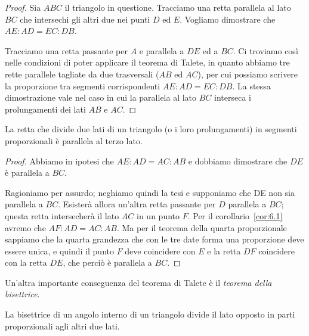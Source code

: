 \begin{figure*}[!htb]
	\centering	
\end{figure*}

\begin{proof}
Sia $ABC$ il triangolo in questione. Tracciamo una retta parallela al lato $BC$ che intersechi gli altri due nei punti $D$ ed $E$. Vogliamo dimostrare che $AE : AD = EC : DB$.

Tracciamo una retta passante per $A$ e parallela a $DE$ ed a $BC$. Ci troviamo così nelle condizioni di poter applicare il teorema di Talete, in quanto abbiamo tre rette parallele tagliate da due trasversali ($AB$ ed $AC$), per cui possiamo scrivere la proporzione tra segmenti corrispondenti $AE : AD = EC : DB$.
La stessa dimostrazione vale nel caso in cui la parallela al lato $BC$ interseca i prolungamenti dei lati $AB$ e $AC$.
\end{proof}

\begin{corollario}\label{cor:6.2}
La retta che divide due lati di un triangolo (o i loro prolungamenti) in segmenti proporzionali è parallela al terzo lato.
\end{corollario}

\begin{figure*}[!htb]
	\centering	
\end{figure*}

\begin{proof}
Abbiamo in ipotesi che $AE : AD = AC : AB$ e dobbiamo dimostrare che $DE$ è parallela a $BC$.

Ragioniamo per assurdo; neghiamo quindi la tesi e supponiamo che DE non sia parallela a $BC$. Esisterà allora un'altra retta passante per $D$ parallela a $BC$; questa retta intersecherà il lato $AC$ in un punto $F$. Per il corollario~\ref{cor:6.1} avremo che $AF : AD = AC : AB$.
Ma per il teorema della quarta proporzionale sappiamo che la quarta grandezza che con le tre date forma una proporzione deve essere unica, e quindi il punto $F$ deve coincidere con $E$ e la retta $DF$ coincidere con la retta $DE$, che perciò è parallela a $BC$.
\end{proof}

Un'altra importante conseguenza del teorema di Talete è il \emph{teorema della bisettrice}.
\begin{teorema}
La bisettrice di un angolo interno di un triangolo divide il lato opposto in parti proporzionali agli altri due lati.
\end{teorema}

